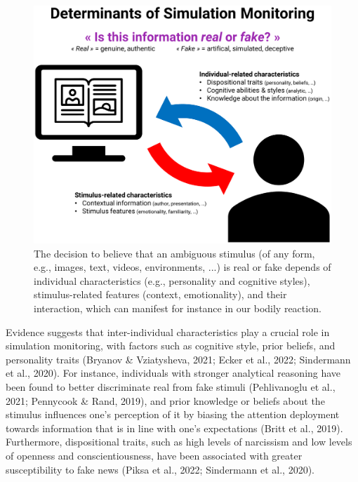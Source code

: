 \documentclass[
  man,mask,floatsintext]{apa6}
\begin{document}
\begin{figure}
\includegraphics[width=1\linewidth]{../figures/Figure1} \caption{The decision to believe that an ambiguous stimulus (of any form, e.g., images, text, videos, environments, ...) is real or fake depends of individual characteristics (e.g., personality and cognitive styles), stimulus-related features (context, emotionality), and their interaction, which can manifest for instance in our bodily reaction.}\label{fig:unnamed-chunk-2}
\end{figure}

Evidence suggests that inter-individual characteristics play a crucial role in simulation monitoring, with factors such as cognitive style, prior beliefs, and personality traits (Bryanov \& Vziatysheva, 2021; Ecker et al., 2022; Sindermann et al., 2020). For instance, individuals with stronger analytical reasoning have been found to better discriminate real from fake stimuli (Pehlivanoglu et al., 2021; Pennycook \& Rand, 2019), and prior knowledge or beliefs about the stimulus influences one's perception of it by biasing the attention deployment towards information that is in line with one's expectations (Britt et al., 2019). Furthermore, dispositional traits, such as high levels of narcissism and low levels of openness and conscientiousness, have been associated with greater susceptibility to fake news (Piksa et al., 2022; Sindermann et al., 2020).
\end{document}
